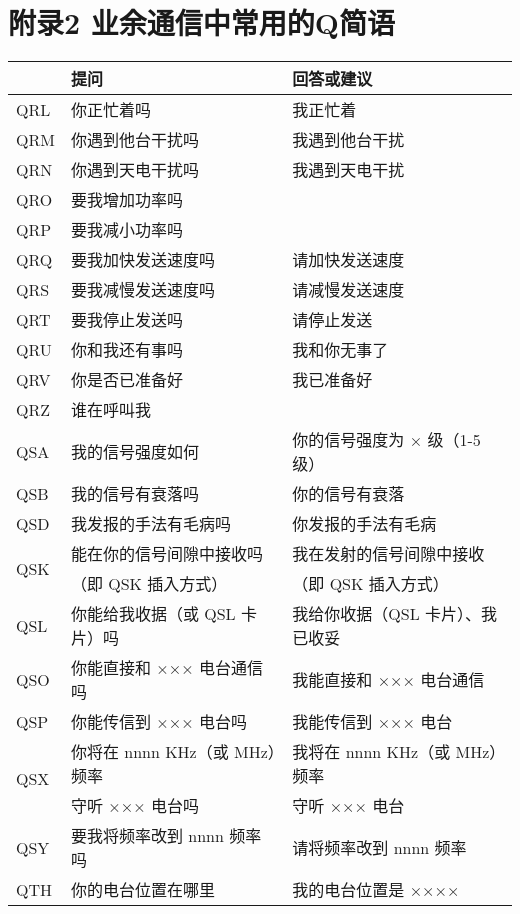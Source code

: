 \newpage

\section{附录2 业余通信中常用的Q简语}

\begin{tabular}{|l|l|l|}
	\hline
	    & \textbf{提问} & \textbf{回答或建议} \\
	\hline
	QRL & 你正忙着吗 & 我正忙着 \\
	\hline
	QRM & 你遇到他台干扰吗 & 我遇到他台干扰 \\
	\hline
	QRN & 你遇到天电干扰吗 & 我遇到天电干扰 \\
	\hline
	QRO & 要我增加功率吗 & \\
	\hline
	QRP & 要我减小功率吗 & \\
	\hline
	QRQ & 要我加快发送速度吗 & 请加快发送速度 \\
	\hline
	QRS & 要我减慢发送速度吗 & 请减慢发送速度 \\
	\hline
	QRT & 要我停止发送吗 & 请停止发送 \\
	\hline
	QRU & 你和我还有事吗 & 我和你无事了 \\
	\hline
	QRV & 你是否已准备好 & 我已准备好 \\
	\hline
	QRZ & 谁在呼叫我 & \\
	\hline
	QSA & 我的信号强度如何 & 你的信号强度为 × 级（1-5 级） \\
	\hline
	QSB & 我的信号有衰落吗 & 你的信号有衰落 \\
	\hline
	QSD & 我发报的手法有毛病吗 & 你发报的手法有毛病 \\
	\hline
	\multirow{2}{1em}{QSK} & 能在你的信号间隙中接收吗 & 我在发射的信号间隙中接收 \\
	& （即 QSK 插入方式）    & （即 QSK 插入方式） \\
	\hline
	QSL & 你能给我收据（或 QSL 卡片）吗 & 我给你收据（QSL 卡片）、我已收妥 \\
	\hline
	QSO & 你能直接和 ××× 电台通信吗 & 我能直接和 ××× 电台通信 \\
	\hline
	QSP & 你能传信到 ××× 电台吗 & 我能传信到 ××× 电台 \\
	\hline
	\multirow{2}{1em}{QSX} & 你将在 nnnn KHz（或 MHz）频率 & 我将在 nnnn KHz（或 MHz）频率 \\
	    & 守听 ××× 电台吗 & 守听 ××× 电台 \\
	\hline
	QSY & 要我将频率改到 nnnn 频率吗 & 请将频率改到 nnnn 频率 \\
	\hline
	QTH & 你的电台位置在哪里 & 我的电台位置是 ×××× \\
	\hline
\end{tabular}

